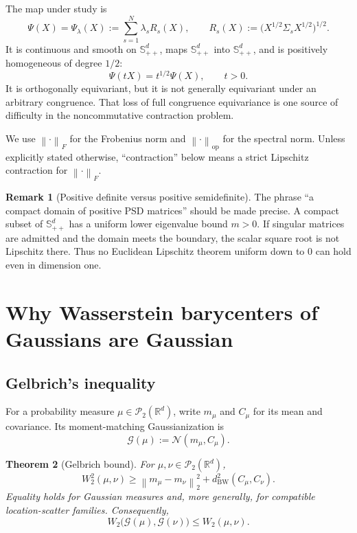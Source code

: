 \documentclass[11pt]{article}
\newtheorem{theorem}{Theorem}[section]
\theoremstyle{definition}
\newtheorem{remark}[theorem]{Remark}
\newcommand{\R}{\mathbb R}
\newcommand{\Spp}{\mathbb S_{++}^d}
\newcommand{\cN}{\mathcal N}
\newcommand{\cP}{\mathcal P}
\newcommand{\cG}{\mathcal G}
\newcommand{\norm}[1]{\left\lVert #1\right\rVert}
\begin{document}
The map under study is
\begin{equation}\label{eq:Psi-def}
 \boxed{\quad
 \Psi(X)=\Psi_\lambda(X):=\sum_{s=1}^N\lambda_s
 R_s(X),\qquad
 R_s(X):=\bigl(X^{1/2}\Sigma_sX^{1/2}\bigr)^{1/2}.
 \quad}
\end{equation}
It is continuous and smooth on $\Spp$, maps $\Spp$ into $\Spp$, and is
positively homogeneous of degree $1/2$:
\begin{equation}\label{eq:homogeneity}
 \Psi(tX)=t^{1/2}\Psi(X),\qquad t>0.
\end{equation}
It is orthogonally equivariant, but it is not generally equivariant under an
arbitrary congruence.  That loss of full congruence equivariance is one source
of difficulty in the noncommutative contraction problem.

We use $\norm{\cdot}_F$ for the Frobenius norm and $\norm{\cdot}_{\mathrm{op}}$
for the spectral norm.  Unless explicitly stated otherwise, ``contraction''
below means a strict Lipschitz contraction for $\norm{\cdot}_F$.

\begin{remark}[Positive definite versus positive semidefinite]
The phrase ``a compact domain of positive PSD matrices'' should be made
precise.  A compact subset of $\Spp$ has a uniform lower eigenvalue bound
$m>0$.  If singular matrices are admitted and the domain meets the boundary,
the scalar square root is not Lipschitz there.  Thus no Euclidean Lipschitz
theorem uniform down to $0$ can hold even in dimension one.
\end{remark}

\section{Why Wasserstein barycenters of Gaussians are Gaussian}

\subsection{Gelbrich's inequality}

For a probability measure $\mu\in\cP_2(\R^d)$, write $m_\mu$ and
$C_\mu$ for its mean and covariance.  Its moment-matching Gaussianization is
\begin{equation}\label{eq:gaussianization}
 \cG(\mu):=\cN(m_\mu,C_\mu).
\end{equation}

\begin{theorem}[Gelbrich bound]\label{thm:gelbrich}
For $\mu,\nu\in\cP_2(\R^d)$,
\begin{equation}\label{eq:gelbrich}
 W_2^2(\mu,\nu)\geq
 \norm{m_\mu-m_\nu}_2^2+
 d_{\mathrm{BW}}^2(C_\mu,C_\nu).
\end{equation}
Equality holds for Gaussian measures and, more generally, for compatible
location-scatter families.  Consequently,
\begin{equation}\label{eq:G-nonexpansive}
 W_2\bigl(\cG(\mu),\cG(\nu)\bigr)\leq W_2(\mu,\nu).
\end{equation}
\end{theorem}
\end{document}

